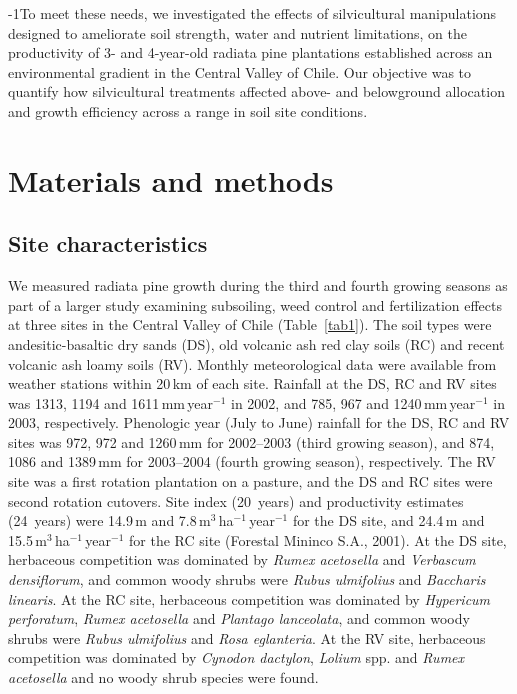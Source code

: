 \documentclass[final]{foresj}
\begin{document}
\looseness-1To meet these needs, we investigated the effects of silvicultural
manipulations designed to ameliorate soil strength, water and nutrient
limitations, on the productivity of 3- and 4-year-old radiata pine
plantations established across an environmental gradient in the Central
Valley of Chile. Our objective was to quantify how silvicultural treatments
affected above- and belowground allocation and growth efficiency across a
range in soil site conditions.

\section{Materials and methods}

\subsection{Site characteristics}

We measured radiata pine growth during the third and fourth
growing seasons as part of a larger study examining
subsoiling, weed control and fertilization effects at three
sites in the Central Valley of Chile (Table~\ref{tab1}).
The soil types were andesitic-basaltic dry sands (DS), old
volcanic ash red clay soils (RC) and recent volcanic ash
loamy soils (RV). Monthly meteorological data were
available from weather stations within 20\,km of each site.
Rainfall at the DS, RC and RV sites was 1313, 1194 and
1611\,mm\,year$^{-1}$ in 2002, and 785, 967 and
1240\,mm\,year$^{-1}$ in 2003, respectively. Phenologic
year (July to June) rainfall for the DS, RC and RV sites
was 972, 972 and 1260\,mm for 2002--2003 (third growing
season), and 874, 1086 and 1389\,mm for 2003--2004 (fourth
growing season), respectively. The RV site was a first
rotation plantation on a pasture, and the DS and RC sites
were second rotation cutovers. Site index (20~years) and
productivity estimates (24~years) were 14.9\,m and
7.8\,m$^{3}$\,ha$^{-1}$\,year$^{-1}$ for the DS site, and
24.4\,m and 15.5\,m$^{3}$\,ha$^{-1}$\,year$^{-1}$ for the
RC site (Forestal Mininco S.A., 2001). At the DS site,
herbaceous competition was dominated by \textit{Rumex
acetosella} and \textit{Verbascum densiflorum}, and common
woody shrubs were \textit{Rubus ulmifolius} and
\textit{Baccharis linearis}. At the RC site, herbaceous
competition was dominated by \textit{Hypericum perforatum},
\textit{Rumex acetosella} and \textit{Plantago lanceolata},
and common woody shrubs were \textit{Rubus ulmifolius} and
\textit{Rosa eglanteria}. At the RV site, herbaceous
competition was dominated by \textit{Cynodon dactylon},
\textit{Lolium} spp. and \textit{Rumex acetosella} and no
woody shrub species were found.
\end{document}
